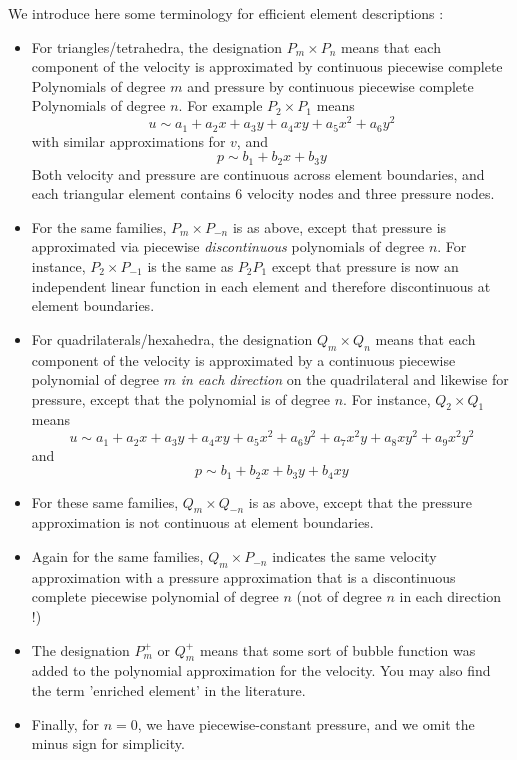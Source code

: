 
We introduce here some terminology for efficient element descriptions \cite{grsa}:
\begin{itemize}
\item For triangles/tetrahedra, the designation 
$P_m \times P_n$ 
means that each component of the velocity
is approximated by continuous piecewise  complete Polynomials of degree $m$ and
pressure by continuous piecewise complete Polynomials of degree  $n$.
For example $P_2 \times P_1$ means 
\[
u \sim a_1 + a_2 x + a_3 y + a_4 xy + a_5 x^2 + a_6 y^2
\]
with similar approximations for $v$, and 
\[
p \sim b_1 + b_2x + b_3 y
\]
Both velocity and pressure are continuous across element boundaries, 
and each triangular element contains 6 velocity nodes and three pressure nodes.

\item For the same families,  
$P_m \times P_{-n}$
is as above, except that pressure is approximated via 
piecewise {\sl discontinuous} polynomials of degree $n$. For instance, $P_2 \times P_{-1}$ is the same 
as $P_2P_1$ except that pressure is now an independent linear function in each element and therefore 
discontinuous at element boundaries.

\item For quadrilaterals/hexahedra, the designation 
  $Q_m \times Q_n$
means that each component of the velocity
is approximated by a continuous piecewise polynomial of degree $m$ {\sl in each direction} on the quadrilateral
and likewise for pressure, except that the polynomial is of degree $n$.
For instance,  $Q_2 \times Q_1$  means
\[
u \sim a_1 + a_2 x + a_3 y + a_4 xy + a_5 x^2 + a_6 y^2 + a_7 x^2y + a_8 xy^2 + a_9 x^2y^2
\]
and 
\[
p \sim b_1 + b_2x + b_3 y + b_4 xy
\]
\item For these same families, $Q_m \times Q_{-n}$ is as above, except that the pressure approximation 
is not continuous at element boundaries. 

\item Again for the same families,  $Q_m \times P_{-n}$
 indicates the same velocity approximation 
with a pressure approximation that is a discontinuous complete piecewise polynomial of degree $n$
(not of degree $n$ in each direction !)

\item The designation $P_m^+$ or $Q_m^+$ means that some sort of bubble function 
was added to the polynomial approximation for the velocity. You may also find the term 'enriched element'
in the literature.

\item Finally, for $n=0$, we have piecewise-constant pressure, and we omit the minus sign for simplicity.
\end{itemize}

